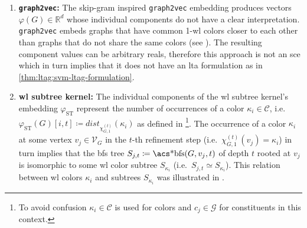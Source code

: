 \begin{enumerate}[label=\textbf{\arabic*.},ref={\arabic*}]
		Under the assumption that the substructure patterns $S_i$ are chosen s.t.\ the their instances $c \in \psi_{\text{FP}, i}(G)$ are nontrivial interpretable constituents, the underlying joint decomposition $\psi_{\text{FP}}(G) \coloneqq \bigcup_{i=1}^d \psi_{\text{FP}, i}(G)$ must also be nontrivial and interpretable.
		Thus, by \cref{thm:ltag:svm-ltag-formulation}, \acp{svm} trained on fingerprint embeddings are \ac{lta} models that produce locally explainable predictions.
	\item \textbf{\texttt{graph2vec}:}
		The skip-gram inspired \texttt{graph2vec} embedding produces vectors $\varphi(G) \in \mathbb{R}^d$ whose individual components do not have a clear interpretation.
		\texttt{graph2vec} embeds graphs that have common 1-\acs{wl} colors closer to each other than graphs that do not share the same colors (see ).
		The resulting component values can be arbitrary reals, therefore this approach is not an \ac{sce} which in turn implies that it does not have an \ac{lta} formulation as in \cref{thm:ltag:svm-ltag-formulation}.
	\item \textbf{\ac{wl} subtree kernel:}\label{itm:ltag:wlst-lta-formulation}
		The individual components of the \ac{wl} subtree kernel's embedding $\varphi_{\text{ST}}$ represent the number of occurrences of a color $\kappa_i \in \mathcal{C}$, i.e.\ $\varphi_{\text{ST}}(G)[i, t] \coloneqq \mathit{dist}_{\chi_{G,1}^{(t)}}(\kappa_i)$ as defined in \footnote{
			To avoid confusion $\kappa_i \in \mathcal{C}$ is used for colors and $c_j \in \mathcal{G}$ for constituents in this context.
		}.
		The occurrence of a color $\kappa_i$ at some vertex $v_j \in \mathcal{V}_G$ in the $t$-th refinement step (i.e.\ $\chi_{G,1}^{(t)}(v_j) = \kappa_i$) in turn implies that the \ac{bfs} tree $S_{j,t} \coloneqq \text{\acs*{bfs}}(G, v_j, t)$ of depth $t$ rooted at $v_j$ is isomorphic to some \ac{wl} color subtree $S_{\kappa_i}$ (i.e.\ $S_{j,t} \simeq S_{\kappa_i}$).
		This relation between \ac{wl} colors $\kappa_i$ and subtrees $S_{\kappa_i}$ was illustrated in .


\end{enumerate}
